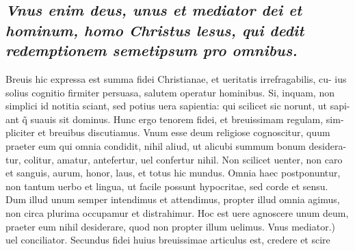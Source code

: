 \documentclass{article}
\begin{document}
\begin{pages}
\subsection*{\textit{Vnus enim deus, unus et mediator dei et hominum, homo Christus lesus, qui dedit redemptionem semetipsum pro omnibus. }}\pstart Breuis hic expressa est summa fidei Christianae, et ueritatis irrefragabilis, cu- ius solius cognitio firmiter persuasa, salutem operatur hominibus. Si, inquam, non simplici id notitia sciant, sed potius uera sapientia: qui scilicet sic norunt, ut sapi- ant q̃ suauis sit dominus. Hunc ergo tenorem fidei, et breuissimam regulam, sim- pliciter et breuibus discutiamus. Vnum esse deum religiose cognoscitur, quum praeter eum qui omnia condidit, nihil aliud, ut alicubi summum bonum desidera- tur, colitur, amatur, antefertur, uel confertur nihil. Non scilicet uenter, non caro et sanguis, aurum, honor, laus, et totus hic mundus. Omnia haec postponuntur, non tantum uerbo et lingua, ut facile possunt hypocritae, sed corde et sensu. Dum illud unum semper intendimus et attendimus, propter illud omnia agimus, non circa plurima occupamur et distrahimur. Hoc est uere agnoscere unum deum, praeter eum nihil desiderare, quod non propter illum uelimus. Vnus mediator.) uel conciliator. Secundus fidei huius breuissimae articulus est, credere et scire  \pend

\end{pages}
\end{document}
